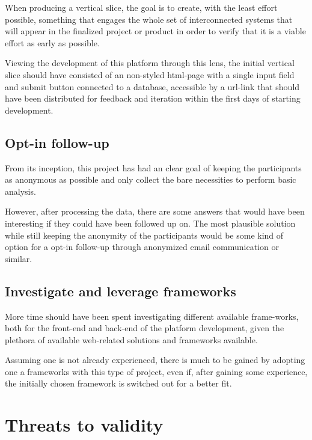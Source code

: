   When producing a vertical slice, the goal is to create, with the least effort
  possible, something that engages the whole set of interconnected systems that
  will appear in the finalized project or product in order to verify that it is
  a viable effort as early as possible.

  Viewing the development of this platform through this lens, the initial vertical
  slice should have consisted of an non-styled html-page with a single input
  field and submit button connected to a database, accessible by a url-link
  that should have been distributed for feedback and iteration within the first
  days of starting development.

  \subsection{Opt-in follow-up}

  From its inception, this project has had an clear goal of keeping the
  participants as anonymous as possible and only collect the bare necessities
  to perform basic analysis.

  However, after processing the data, there are some answers that would have
  been interesting if they could have been followed up on. The most plausible
  solution while still keeping the anonymity of the participants would be some
  kind of option for a opt-in follow-up through anonymized email communication
  or similar.

  \subsection{Investigate and leverage frameworks}

  More time should have been spent investigating different available
  frame-works, both for the front-end and back-end of the platform development,
  given the plethora of available web-related solutions and frameworks available.

  Assuming one is not already experienced, there is much to be gained by
  adopting one a frameworks with this type of project, even if, after gaining
  some experience, the initially chosen framework is switched out for a better
  fit.


  \section{Threats to validity}

